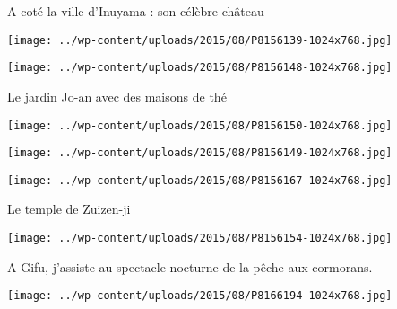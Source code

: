  A coté la ville d'Inuyama : son célèbre château 

 

\begin{center} \texttt{[image: ../wp-content/uploads/2015/08/P8156139-1024x768.jpg]} \end{center}

 

 

\begin{center} \texttt{[image: ../wp-content/uploads/2015/08/P8156148-1024x768.jpg]} \end{center}

 

 Le jardin Jo-an avec des maisons de thé 

 

\begin{center} \texttt{[image: ../wp-content/uploads/2015/08/P8156150-1024x768.jpg]} \end{center}

 

 

\begin{center} \texttt{[image: ../wp-content/uploads/2015/08/P8156149-1024x768.jpg]} \end{center}

 

 

\begin{center} \texttt{[image: ../wp-content/uploads/2015/08/P8156167-1024x768.jpg]} \end{center}

 

 Le temple de Zuizen-ji 

 

\begin{center} \texttt{[image: ../wp-content/uploads/2015/08/P8156154-1024x768.jpg]} \end{center}

 

 A Gifu, j'assiste au spectacle nocturne de la pêche aux cormorans. 

 

\begin{center} \texttt{[image: ../wp-content/uploads/2015/08/P8166194-1024x768.jpg]} \end{center}

 

 

